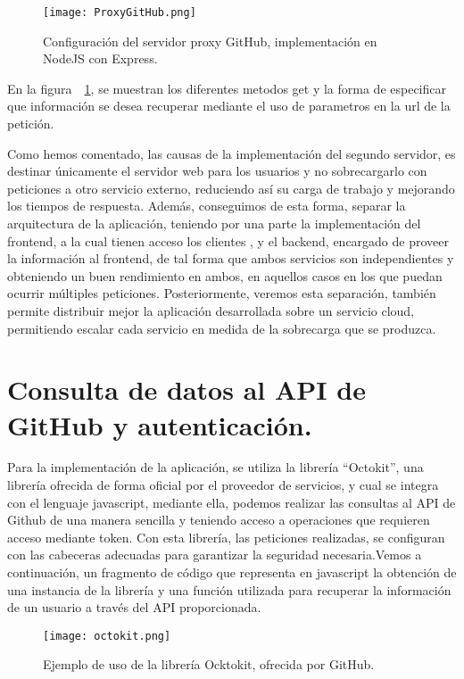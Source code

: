 \begin{figure}[h!]
  \centerline{\texttt{[image: ProxyGitHub.png]}}
  \caption{Configuración del servidor proxy GitHub, implementación en NodeJS con Express.}
  \label{figure:ProxyGitHub}
\end{figure}
En la figura~~\ref{figure:ProxyGitHub}, se muestran los diferentes metodos get y la forma de especificar que información se desea recuperar mediante el uso de parametros en la url de la petición.


Como hemos comentado, las causas de la implementación del segundo servidor, es destinar únicamente el servidor web para los usuarios y no sobrecargarlo con peticiones a otro servicio externo, reduciendo así su carga de trabajo y mejorando los tiempos de respuesta. Además, conseguimos de esta forma, separar la arquitectura de la aplicación, teniendo por una parte la implementación del frontend, a la cual tienen acceso los clientes , y el backend, encargado de proveer la información al frontend, de tal forma que ambos servicios son independientes y obteniendo un buen rendimiento en ambos, en aquellos casos en los que puedan ocurrir múltiples peticiones. Posteriormente, veremos esta separación, también permite distribuir mejor la aplicación desarrollada sobre un servicio cloud, permitiendo escalar cada servicio en medida de la sobrecarga que se produzca.



\section{Consulta de datos al API de GitHub y autenticación.}

Para la implementación de la aplicación, se utiliza la librería “Octokit”\cite{Octokit,OctokitDoc}, una librería ofrecida de forma oficial por el proveedor de servicios, y cual se integra con el lenguaje javascript, mediante ella, podemos realizar las consultas al API de Github de una manera sencilla y teniendo acceso a operaciones que requieren acceso mediante token. Con esta librería, las peticiones realizadas, se configuran con las cabeceras adecuadas para garantizar la seguridad necesaria.Vemos a continuación, un fragmento de código que representa en javascript la obtención de una instancia de la librería y una función utilizada para recuperar la información de un usuario a través del API proporcionada.

\begin{figure}[h!]
  \centerline{\texttt{[image: octokit.png]}}
  \caption{Ejemplo de uso de la librería Ocktokit, ofrecida por GitHub.}
  \label{figure:octokit}
\end{figure}

